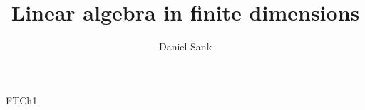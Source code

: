\documentclass{article}
\title{Linear algebra in finite dimensions}
\author{Daniel Sank}
\begin{document}
\maketitle
{FTCh1}
\end{document}
